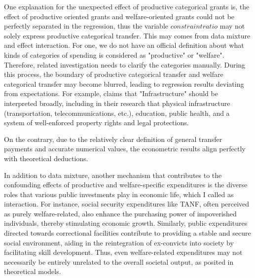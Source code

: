 One explanation for the unexpected effect of productive categorical grants is, the effect of productive oriented grants and welfare-oriented grants could not be perfectly separated in the regression, thus the variable $constraintratio$ may not solely express productive categorical transfer. This may comes from data mixture and effect interaction. For one, we do not have an official definition about what kinds of categories of spending is considered as "productive" or "welfare". Therefore, related investigation needs to clarify the categories manually. During this process, the boundary of productive categorical transfer and welfare categorical transfer may become blurred, leading to regression results deviating from expectations. For example, \textcite{cai2005does} claims that "Infrastructure" should be interpreted broadly, including in their research that physical infrastructure (transportation, telecommunications, etc.), education, public health, and a system of well-enforced property rights and legal protections.

On the contrary, due to the relatively clear definition of general transfer payments and accurate numerical values, the econometric results align perfectly with theoretical deductions.

In addition to data mixture, another mechanism that contributes to the confounding effects of productive and welfare-specific expenditures is the diverse roles that various public investments play in economic life, which I called as interaction. For instance, social security expenditures like TANF, often perceived as purely welfare-related, also enhance the purchasing power of impoverished individuals, thereby stimulating economic growth. Similarly, public expenditures directed towards correctional facilities contribute to providing a stable and secure social environment, aiding in the reintegration of ex-convicts into society by facilitating skill development. Thus, even welfare-related expenditures may not necessarily be entirely unrelated to the overall societal output, as posited in theoretical models.


